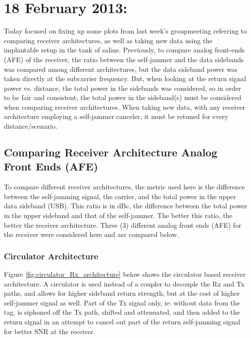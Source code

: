 \documentclass[12pt,onecolumn,titlepage]{article}
\begin{document}
\clearpage
\section{18 February 2013:}

\indent \indent Today focused on fixing up some plots from last week's groupmeeting referring to comparing receiver architectures, as well as taking new data using the implantable setup in the tank of saline. Previously, to compare analog front-ends (AFE) of the receiver, the ratio between the self-jammer and the data sidebands was compared among different architectures, but the data sideband power was taken directly at the subcarrier frequency. But, when looking at the return signal power vs. distance, the total power in the sidebands was considered, so in order to be fair and consistent, the total power in the sideband(s) must be considered when comparing receiver architectures. When taking new data, with any receiver architecture employing a self-jammer canceler, it must be retuned for every distance/scenario.

\subsection{Comparing Receiver Architecture Analog Front Ends (AFE)}
\indent \indent To compare different receiver architectures, the metric used here is the difference between the self-jamming signal, the carrier, and the total power in the upper data sideband (USB). This ratio is in dBc, the difference between the total power in the upper sideband and that of the self-jammer. The better this ratio, the better the receiver architecture. Three (3) different analog front ends (AFE) for the receiver were considered here and are compared below.

\subsubsection{Circulator Architecture}
\indent \indent Figure \ref{fig:circulator_Rx_architecture} below shows the circulator based receiver architecture. A circulator is used instead of a coupler to decouple the Rx and Tx paths, and allows for higher sideband return strength, but at the cost of higher self-jammer signal as well. Part of the Tx signal only, ie: without data from the tag, is siphoned off the Tx path, shifted and attenuated, and then added to the return signal in an attempt to cancel out part of the return self-jamming signal for better SNR at the receiver.
\end{document}
